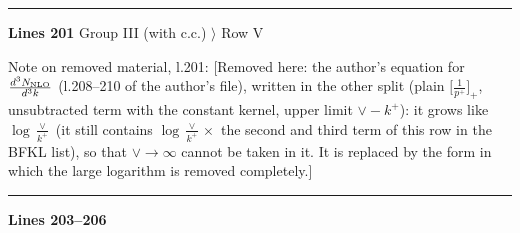 \documentclass[10pt]{article}
\newenvironment{notebox}{\def\FrameCommand{{\color{notebar}\vrule width 1.5pt}\hspace{6pt}}\MakeFramed{\advance\hsize-\width\FrameRestore}\small}{\endMakeFramed}
\begin{document}
\noindent{\small\textsf{Unmarked edit, l.194 (deleted):} \texttt{\textbackslash{}\allowbreak{}left[f\^{}\{cbd\}\allowbreak{}\textbackslash{}\allowbreak{},\allowbreak{}U\^{}\{ac\}\allowbreak{}(w)\allowbreak{}\textbackslash{}\allowbreak{},\allowbreak{}\textbackslash{}\allowbreak{}rho\^{}\{d\}\allowbreak{}(x)\allowbreak{}}}\par
{}\noindent\rule{\linewidth}{0.3pt}\par\noindent\textbf{Lines 201} \quad \textsf{Group III (with c.c.) $\rangle$ Row V}\par
\begin{notebox}\textsf{\small Note on removed material, l.201:} [Removed here: the author's equation for $\frac{d^{3}N_{\rm NLO}}{d^{3}k}$ (l.208--210 of the author's file), written in the other split (plain $\big[\frac{1}{p^{+}}\big]_{+}$, unsubtracted term with the constant kernel, upper limit $\vee-k^{+}$): it grows like $\log\frac{\vee}{k^{+}}$ (it still contains $\log\frac{\vee}{k^{+}}\times$ the second and third term of this row in the BFKL list), so that $\vee\to\infty$ cannot be taken in it. It is replaced by the form in which the large logarithm is removed completely.]\end{notebox}
\noindent\rule{\linewidth}{0.3pt}\par\noindent\textbf{Lines 203--206} \par
\end{document}
